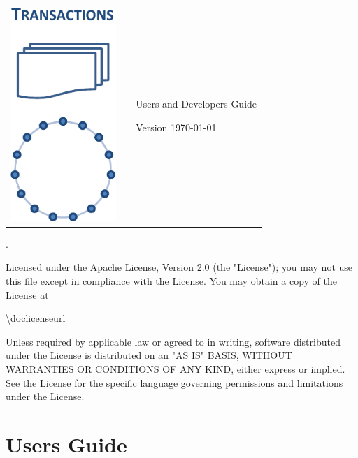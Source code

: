 \documentclass[a4paper]{scrreprt}
\begin{document}
\vspace*{4cm}
\thispagestyle{empty}
\setlength{\parskip}{1ex}
\begin{tabular}{p{4cm}p{0.5cm}p{10cm}}
\parbox{4cm}{\includegraphics[width=4cm]{scalaris-layers}}
& &\sffamily\bfseries\Huge
  \bigskip {\textcolor{rltblue}{\scalaris{}:}}

\medskip
 \mdseries Users and Developers Guide

\bigskip\medskip
\LARGE Version \docversion{} \hfill \today\\
\end{tabular}
\vfill
{\scriptsize
\doccopyright{}.

Licensed under the Apache License, Version 2.0 (the "License");
you may not use this file except in compliance with the License.
You may obtain a copy of the License at

\url{\doclicenseurl}

Unless required by applicable law or agreed to in writing, software
distributed under the License is distributed on an "AS IS" BASIS,
WITHOUT WARRANTIES OR CONDITIONS OF ANY KIND, either express or implied.
See the License for the specific language governing permissions and
limitations under the License.
}

\tableofcontents

\part{Users Guide}






\end{document}
